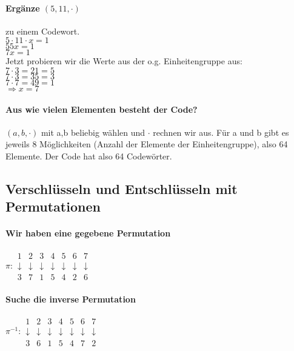\paragraph{Ergänze $(5,11,\cdot)$} zu einem Codewort.\\
$5\cdot 11\cdot x=1$\\
$55 x = 1$\\
$7 x = 1$ \\
Jetzt probieren wir die Werte aus der o.g. Einheitengruppe aus:\\
$7\cdot 3=21=5$\\
$7\cdot 3=35=3$\\
$7\cdot 7=49=1$\\
$\Rightarrow x=7$

\paragraph{Aus wie vielen Elementen besteht der Code?}
$(a,b,\cdot)$ mit a,b beliebig wählen und $\cdot$ rechnen wir aus.
Für a und b gibt es jeweils 8 Möglichkeiten (Anzahl der Elemente der Einheitengruppe), also 64 Elemente. Der Code hat also 64 Codewörter. 

\subsection{Verschlüsseln und Entschlüsseln mit Permutationen}
\paragraph{Wir haben eine gegebene Permutation}
$\pi: 
\begin{array}{ccccccc}
1 & 2 & 3 & 4 & 5 & 6 & 7 \\ 
\downarrow & \downarrow & \downarrow & \downarrow & \downarrow & \downarrow & \downarrow \\ 
3 & 7 & 1 & 5 & 4 & 2 & 6
\end{array} 
$
\paragraph{Suche die inverse Permutation}
$\pi^{-1}: 
\begin{array}{ccccccc}
1 & 2 & 3 & 4 & 5 & 6 & 7 \\ 
\downarrow & \downarrow & \downarrow & \downarrow & \downarrow & \downarrow & \downarrow \\ 
3 & 6 & 1 & 5 & 4 & 7 & 2
\end{array} 
$

